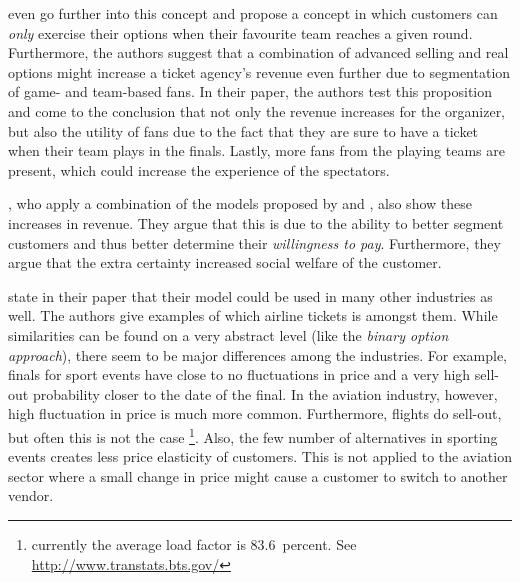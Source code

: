  even go further into this concept and propose a concept in which customers can \emph{only} exercise their options when their favourite team reach\-es a given round. Furthermore, the authors suggest that a combination of advanced selling and real options might increase a ticket agency's revenue even further due to segmentation of game- and team-based fans. In their paper, the authors test this proposition and come to the conclusion that not only the revenue increases for the organizer, but also the utility of fans due to the fact that they are sure to have a ticket when their team plays in the finals. Lastly, more fans from the playing teams are present, which could increase the experience of the spectators.

, who apply a combination of the models proposed by  and , also show these increases in revenue. They argue that this is due to the ability to better segment customers and thus better determine their \emph{willingness to pay}. Furthermore, they argue that the extra certainty increased social welfare of the customer.

 state in their paper that their model could be used in many other industries as well. The authors give examples of which airline tickets is amongst them. While similarities can be found on a very abstract level (like the \emph{binary option approach}), there seem to be major differences among the industries. For example, finals for sport events have close to no fluctuations in price and a very high sell-out probability closer to the date of the final. In the aviation industry, however, high fluctuation in price is much more common. Furthermore, flights do sell-out, but often this is not the case \footnote{currently the average load factor is 83.6~percent. See \url{http://www.transtats.bts.gov/}}. Also, the few number of alternatives in sporting events creates less price elasticity of customers. This is not applied to the aviation sector where a small change in price might cause a customer to switch to another vendor.

